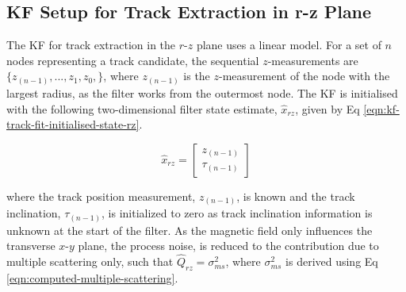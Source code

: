 \subsection{KF Setup for Track Extraction in r-z Plane}
\label{chapter-6-end-of-derivation}

The KF for track extraction in the $r$-$z$ plane uses a linear model. For a set of $n$ nodes representing a track candidate, the sequential $z$-measurements are $\{z_{(n-1)}, ..., z_1, z_0, \}$, where $z_{(n-1)}$ is the $z$-measurement of the node with the largest radius, as the filter works from the outermost node. The KF is initialised with the following two-dimensional filter state estimate, $\hat{x}_{rz}$, given by Eq \eqref{eqn:kf-track-fit-initialised-state-rz}.

\begin{equation}
\hat{x}_{rz} = \begin{bmatrix} z_{(n-1)} \\ \tau_{(n-1)} \end{bmatrix} 
\label{eqn:kf-track-fit-initialised-state-rz}
\end{equation}


where the track position measurement, $z_{(n-1)}$, is known and the track inclination, $\tau_{(n-1)}$, is initialized to zero as track inclination information is unknown at the start of the filter. As the magnetic field only influences the transverse $x$-$y$ plane, the process noise, is reduced to the contribution due to multiple scattering only, such that $\hat{Q}_{rz} = \sigma_{ms}^{2}$, where $\sigma_{ms}^{2}$ is derived using Eq \eqref{eqn:computed-multiple-scattering}.






